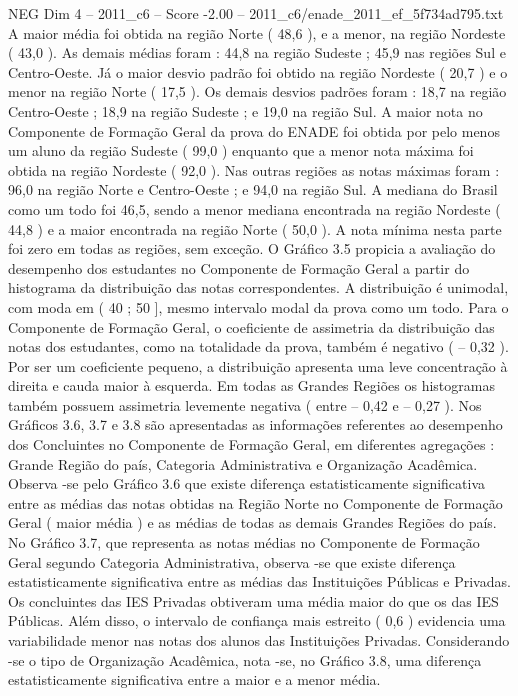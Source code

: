 \begin{textsample}{NEG Dim 4 – 2011\_c6 – Score -2.00 – 2011\_c6/enade\_2011\_ef\_5f734ad795.txt}
A maior média foi obtida na região Norte ( 48,6 ), e a menor, na região Nordeste ( 43,0 ).
As demais médias foram : 44,8 na região Sudeste ; 45,9 nas regiões Sul e Centro-Oeste.
Já o maior desvio padrão foi obtido na região Nordeste ( 20,7 ) e o menor na região Norte ( 17,5 ).
Os demais desvios padrões foram : 18,7 na região Centro-Oeste ; 18,9 na região Sudeste ; e 19,0 na região Sul.
A maior nota no Componente de Formação Geral da prova do ENADE foi obtida por pelo menos um aluno da região Sudeste ( 99,0 ) enquanto que a menor nota máxima foi obtida na região Nordeste ( 92,0 ).
Nas outras regiões as notas máximas foram : 96,0 na região Norte e Centro-Oeste ; e 94,0 na região Sul.
A mediana do Brasil como um todo foi 46,5, sendo a menor mediana encontrada na região Nordeste ( 44,8 ) e a maior encontrada na região Norte ( 50,0 ).
A nota mínima nesta parte foi zero em todas as regiões, sem exceção.
O Gráfico 3.5 propicia a avaliação do desempenho dos estudantes no Componente de Formação Geral a partir do histograma da distribuição das notas correspondentes.
A distribuição é unimodal, com moda em ( 40 ; 50 ], mesmo intervalo modal da prova como um todo.
Para o Componente de Formação Geral, o coeficiente de assimetria da distribuição das notas dos estudantes, como na totalidade da prova, também é negativo ( – 0,32 ).
Por ser um coeficiente pequeno, a distribuição apresenta uma leve concentração à direita e cauda maior à esquerda.
Em todas as Grandes Regiões os histogramas também possuem assimetria levemente negativa ( entre – 0,42 e – 0,27 ).
Nos Gráficos 3.6, 3.7 e 3.8 são apresentadas as informações referentes ao desempenho dos Concluintes no Componente de Formação Geral, em diferentes agregações : Grande Região do país, Categoria Administrativa e Organização Acadêmica.
Observa -se pelo Gráfico 3.6 que existe diferença estatisticamente significativa entre as médias das notas obtidas na Região Norte no Componente de Formação Geral ( maior média ) e as médias de todas as demais Grandes Regiões do país.
No Gráfico 3.7, que representa as notas médias no Componente de Formação Geral segundo Categoria Administrativa, observa -se que existe diferença estatisticamente significativa entre as médias das Instituições Públicas e Privadas.
Os concluintes das IES Privadas obtiveram uma média maior do que os das IES Públicas.
Além disso, o intervalo de confiança mais estreito ( 0,6 ) evidencia uma variabilidade menor nas notas dos alunos das Instituições Privadas.
Considerando -se o tipo de Organização Acadêmica, nota -se, no Gráfico 3.8, uma diferença estatisticamente significativa entre a maior e a menor média.

\end{textsample}
